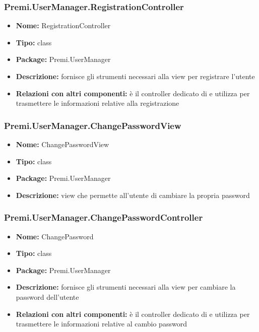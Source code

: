 \subsubsection{Premi.UserManager.RegistrationController}
\begin{itemize}
  \item \textbf{Nome:} RegistrationController
  \item \textbf{Tipo:} class
  \item \textbf{Package:} Premi.UserManager
  \item \textbf{Descrizione:} fornisce gli strumenti necessari alla view per registrare l'utente
  \item \textbf{Relazioni con altri componenti:} è il controller dedicato di  e utilizza  per trasmettere le informazioni relative alla registrazione
\end{itemize}
\subsubsection{Premi.UserManager.ChangePasswordView}
\begin{itemize}
  \item \textbf{Nome:} ChangePasswordView
  \item \textbf{Tipo:} class
  \item \textbf{Package:} Premi.UserManager
  \item \textbf{Descrizione:} view che permette all'utente di cambiare la propria password
\end{itemize}
\subsubsection{Premi.UserManager.ChangePasswordController}
\begin{itemize}
  \item \textbf{Nome:} ChangePassword
  \item \textbf{Tipo:} class
  \item \textbf{Package:} Premi.UserManager
  \item \textbf{Descrizione:} fornisce gli strumenti necessari alla view per cambiare la password dell'utente
  \item \textbf{Relazioni con altri componenti:} è il controller dedicato di  e utilizza   per trasmettere le informazioni relative al cambio password
\end{itemize}



